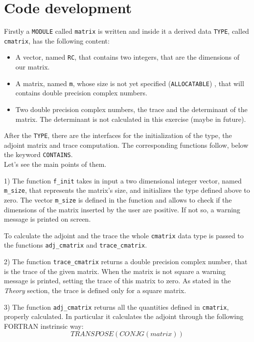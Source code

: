 \documentclass{article}
\begin{document}
\section*{Code development}
Firstly a \texttt{MODULE} called \texttt{matrix} is written and inside it a derived data \texttt{TYPE}, called \texttt{cmatrix}, has the following content:
\begin{itemize}
 \item A vector, named \texttt{RC}, that contains two integers, that are the dimensions of our matrix.
  \item A matrix, named \texttt{m}, whose size is not yet specified (\texttt{ALLOCATABLE}) , that will contains double precision complex numbers.
    \item Two double precision complex numbers, the trace and the determinant of the matrix. The determinant is not calculated in this exercise (maybe in future).
\end{itemize}
After the \texttt{TYPE}, there are the interfaces for the initialization of the type, the adjoint matrix and trace computation. The corresponding functions follow, below the keyword \texttt{CONTAINS}.\\
Let's see the main points of them.
\begin{description}
 \item{1)} The function \texttt{f\_init} takes in input a two dimensional integer vector, named \texttt{m\_size}, that represents the matrix's size, and initializes the type defined above to zero. The vector \texttt{m\_size} is defined in the function and allows to check if the dimensions of the matrix inserted by the user are positive. If not so, a warning message is printed on screen.
 \end{description}
 To calculate the adjoint and the trace
 the whole \texttt{cmatrix} data type is passed to the functions \texttt{adj\_cmatrix} and \texttt{trace\_cmatrix}.
 \begin{description}
 \item{2)} The function \texttt{trace\_cmatrix} returns a double precision complex number, that is the trace of the given matrix. When the matrix is not square a warning message is printed, setting the trace of this matrix to zero. As stated in the \textit{Theory} section, the trace is defined only for a square matrix.
 \item{3)} The function  \texttt{adj\_cmatrix} returns all the quantities defined in \texttt{cmatrix}, properly calculated.
In particular it calculates the adjoint through the following FORTRAN instrinsic way:
\begin{equation}
    TRANSPOSE(CONJG(matrix))
\end{equation}
\end{description}
\end{document}
